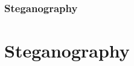 \section[Section]{Steganography}
\part{Steganography}
\begin{frame}
	\partpage
	\centering
\end{frame}
